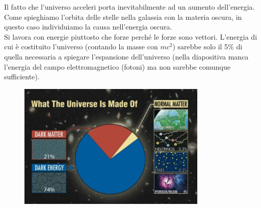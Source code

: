 \documentclass[a4paper,11pt]{article}
\begin{document}
Il fatto che l'universo acceleri porta inevitabilmente ad un aumento dell'energia. Come spieghiamo l'orbita delle stelle nella galassia con la materia oscura, in questo caso individuiamo la causa nell'energia oscura. \\
Si lavora con energie piuttosto che forze perché le forze sono vettori. L'energia di cui è costituito l'universo (contando la masse con $mc^2$) sarebbe solo il 5\% di quella necessaria a spiegare l'espansione dell'universo (nella diapositiva manca l'energia del campo elettromagnetico (fotoni) ma non sarebbe comunque sufficiente).
\begin{figure}[h!!]
        \centering
        \includegraphics[width=0.8\textwidth]{immagini16dic/tortauniverso.png}
        \label{}
    \end{figure}
\end{document}
